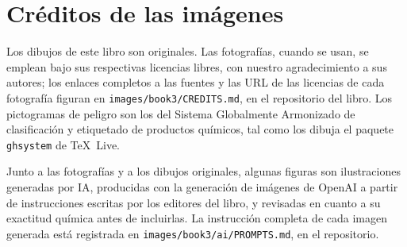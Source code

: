 \chapter*{Créditos de las imágenes}

Los dibujos de este libro son originales. Las fotografías, cuando se
usan, se emplean bajo sus respectivas licencias libres, con nuestro
agradecimiento a sus autores; los enlaces completos a las fuentes y las
URL de las licencias de cada fotografía figuran en
\texttt{images/book3/CREDITS.md}, en el repositorio del libro.
Los pictogramas de peligro son los del Sistema Globalmente Armonizado de
clasificación y etiquetado de productos químicos, tal como los dibuja el
paquete \texttt{ghsystem} de \TeX\ Live.

\bigskip
Junto a las fotografías y a los dibujos originales, algunas figuras son
ilustraciones generadas por IA, producidas con la generación de imágenes
de OpenAI a partir de instrucciones escritas por los editores del libro,
y revisadas en cuanto a su exactitud química antes de incluirlas. La
instrucción completa de cada imagen generada está registrada en
\texttt{images/book3/ai/PROMPTS.md}, en el repositorio.

